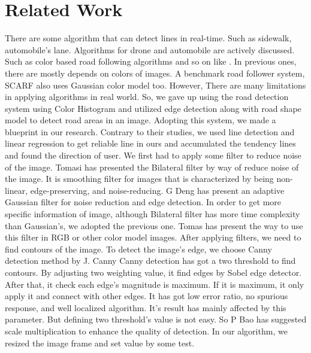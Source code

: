 \section{Related Work}
\label{sec:relatedwork}
There are some algorithm that can detect lines in real-time. Such as sidewalk, automobile's lane. Algorithms for drone and automobile are actively discussed. Such as color based road following algorithms and so on like \cite[Color-based road detection in urban traffic scenes]{he2004color}. \newline
In previous ones, there are mostly depends on colors of images. A benchmark road follower system, SCARF\cite[Supervised Classification Applied to Road Following]{seng2008sidewalk} also uses Gaussian color model too. However, There are many limitations in applying  algorithms in real world. So, we gave up using the road detection system using Color Histogram and utilized edge detection along with road shape model to detect road areas in an image. Adopting this system, we made a blueprint in our research. Contrary to their studies, we used line detection and linear regression to get reliable line in ours and accumulated the tendency lines and found the direction of user. \newline
We first had to apply some filter to reduce noise of the image. Tomasi\cite[Bilateral filtering for gray and color images]{tomas1998bilateral} has presented the Bilateral filter by way of reduce noise of the image. It is smoothing filter for images that is characterized by being non-linear, edge-preserving, and noise-reducing. G Deng \cite[An adaptive Gaussian filter for noise reduction and edge detection]{deng1993adaptive} has present an adaptive Gaussian filter for noise reduction and edge detection. In order to get more specific information of image, although Bilateral filter has more time complexity than Gaussian's, we adopted the previous one. Tomas has present the way to use this filter in RGB or other color model images.\newline
After applying filters, we need to find contours of the image. To detect the image's edge, we choose Canny detection method by J. Canny\cite[A computational approach to edge detection.]{canny1986computational} Canny detection has got a two threshold to find contours. By adjusting two weighting value, it find edges by Sobel edge detector. After that, it check each edge's magnitude is maximum. If it is maximum, it only apply it and connect with other edges. It has got low error ratio, no spurious response, and well localized algorithm. It's result has mainly affected by this parameter. But defining two threshold's value is not easy. So P Bao \cite[Canny edge detection enhancement by scale multiplication.]{bao2005canny} has suggested scale multiplication to enhance the quality of detection. In our algorithm, we resized the image frame and set value by some test.\newline
